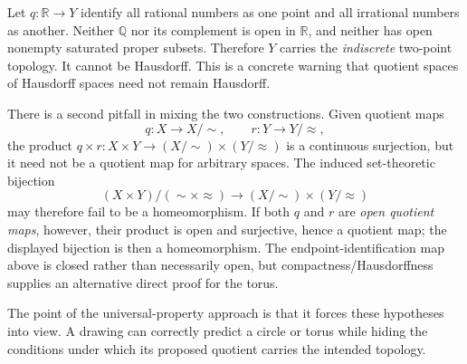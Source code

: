 Let \(q:\mathbb R\to Y\) identify all rational numbers as one point and all irrational numbers as another. Neither \(\mathbb Q\) nor its complement is open in \(\mathbb R\), and neither has open nonempty saturated proper subsets. Therefore \(Y\) carries the \emph{indiscrete} two-point topology. It cannot be Hausdorff. This is a concrete warning that quotient spaces of Hausdorff spaces need not remain Hausdorff.

There is a second pitfall in mixing the two constructions. Given quotient maps
\[
 q:X\to X/{\sim},\qquad r:Y\to Y/{\approx},
\]
the product \(q\times r:X\times Y\to(X/{\sim})\times(Y/{\approx})\) is a continuous surjection, but it need not be a quotient map for arbitrary spaces. The induced set-theoretic bijection
\[
 (X\times Y)/({\sim}\times{\approx})
 \longrightarrow (X/{\sim})\times(Y/{\approx})
\]
may therefore fail to be a homeomorphism. If both \(q\) and \(r\) are \emph{open quotient maps}, however, their product is open and surjective, hence a quotient map; the displayed bijection is then a homeomorphism. The endpoint-identification map above is closed rather than necessarily open, but compactness/Hausdorffness supplies an alternative direct proof for the torus.

The point of the universal-property approach is that it forces these hypotheses into view. A drawing can correctly predict a circle or torus while hiding the conditions under which its proposed quotient carries the intended topology.
